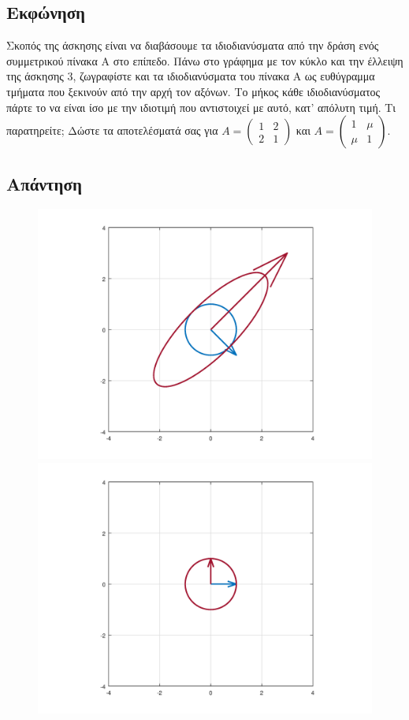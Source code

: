 \documentclass[a4paper,12pt]{article}
\begin{document}
\subsection{Εκφώνηση}
Σκοπός της άσκησης είναι να διαβάσουμε τα ιδιοδιανύσματα από την δράση ενός συμμετρικού πίνακα Α στο
επίπεδο. Πάνω στο γράφημα με τον κύκλο και την έλλειψη της άσκησης 3, ζωγραφίστε και τα ιδιοδιανύσματα
του πίνακα Α ως ευθύγραμμα τμήματα που ξεκινούν από την αρχή τον αξόνων. Το μήκος κάθε ιδιοδιανύσματος
πάρτε το να είναι ίσο με την ιδιοτιμή που αντιστοιχεί με αυτό, κατ' απόλυτη τιμή. Τι παρατηρείτε; Δώστε
τα αποτελέσματά σας για $
	A=\begin{pmatrix}
		1 & 2 \\
		2 & 1
	\end{pmatrix}
$ και $
	A=\begin{pmatrix}
		1   & \mu \\
		\mu & 1
	\end{pmatrix}
$.
\subsection{Απάντηση}
\begin{figure}
	\centering
	\includegraphics[scale=0.6]{4i.png}
	\caption{}
	\includegraphics[scale=0.6]{4ii.png}
	\caption{}
\end{figure}
\end{document}
